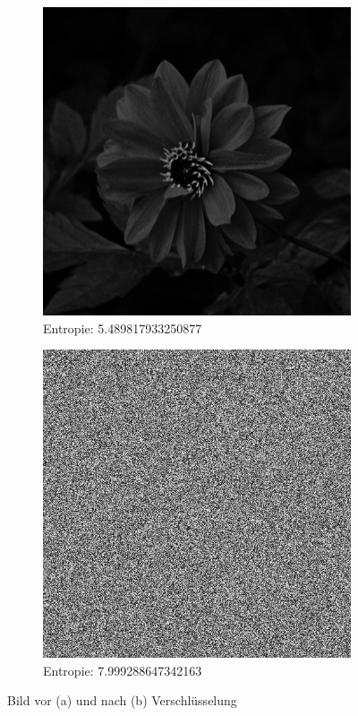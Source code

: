 \begin{figure}
	\centering

	\begin{subfigure}{0.35\textwidth}
		\includegraphics[width=\textwidth]{../1/3/gray_5.489817933250877_flower.jpg}
		\caption{Entropie: 5.489817933250877}
	\end{subfigure}
	\hfill
	\begin{subfigure}{0.35\textwidth}
		\includegraphics[width=\textwidth]{../1/3/encrypted_7.999288647342163_flower.jpg}
		\caption{Entropie: 7.999288647342163}
	\end{subfigure}

	\caption{Bild vor (a) und nach (b) Verschlüsselung}
	\label{fig:flower}
\end{figure}

